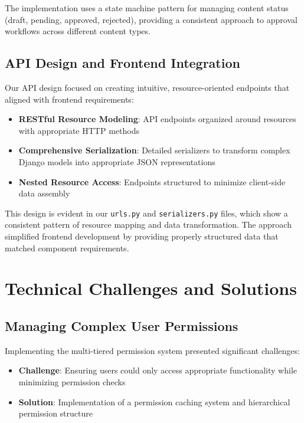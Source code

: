The implementation uses a state machine pattern for managing content status (draft, 
pending, approved, rejected), providing a consistent approach to approval workflows 
across different content types.

\subsection{API Design and Frontend Integration}

Our API design focused on creating intuitive, resource-oriented endpoints that aligned 
with frontend requirements:

\begin{itemize}
    \item \textbf{RESTful Resource Modeling}: API endpoints organized around resources 
    with appropriate HTTP methods
    \item \textbf{Comprehensive Serialization}: Detailed serializers to transform complex
    Django models into appropriate JSON representations
    \item \textbf{Nested Resource Access}: Endpoints structured to minimize client-side 
    data assembly
\end{itemize}

This design is evident in our \texttt{urls.py} and \texttt{serializers.py} files, which 
show a consistent pattern of resource mapping and data transformation. The approach 
simplified frontend development by providing properly structured data that matched 
component requirements.

\section{Technical Challenges and Solutions}

\subsection{Managing Complex User Permissions}

Implementing the multi-tiered permission system presented significant challenges:

\begin{itemize}
    \item \textbf{Challenge}: Ensuring users could only access appropriate functionality 
    while minimizing permission checks
    \item \textbf{Solution}: Implementation of a permission caching system and 
    hierarchical permission structure
\end{itemize}


